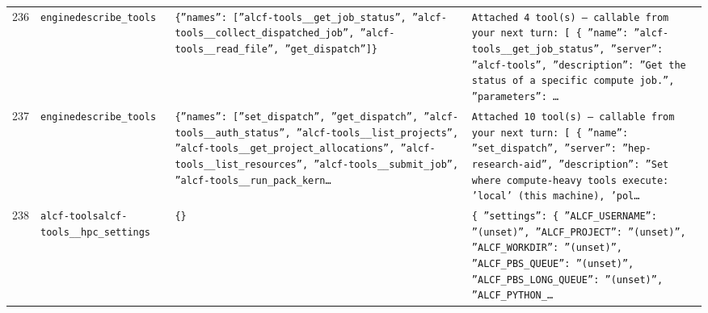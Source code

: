 \documentclass[11pt,a4paper]{article}
\begin{document}
\begin{longtable}{@{}p{}p{}p{}p{}@{}}
236 & \texttt{engine}\newline\texttt{describe\_\allowbreak{}tools} & \texttt{\{''names'':\allowbreak{} [''alcf-tools\_\allowbreak{}\_\allowbreak{}get\_\allowbreak{}job\_\allowbreak{}status'',\allowbreak{} ''alcf-tools\_\allowbreak{}\_\allowbreak{}collect\_\allowbreak{}dispatched\_\allowbreak{}job'',\allowbreak{} ''alcf-tools\_\allowbreak{}\_\allowbreak{}read\_\allowbreak{}file'',\allowbreak{} ''get\_\allowbreak{}dispatch'']\allowbreak{}\}\allowbreak{}} & \texttt{Attached 4 tool(s)\allowbreak{} --- callable from your next turn:\allowbreak{} [  \{   ''name'':\allowbreak{} ''alcf-tools\_\allowbreak{}\_\allowbreak{}get\_\allowbreak{}job\_\allowbreak{}status'',\allowbreak{}   ''server'':\allowbreak{} ''alcf-tools'',\allowbreak{}   ''description'':\allowbreak{} ''Get the status of a specific compute job.'',\allowbreak{}   ''parameters'':\allowbreak{} \ldots{}\allowbreak{}} \\
237 & \texttt{engine}\newline\texttt{describe\_\allowbreak{}tools} & \texttt{\{''names'':\allowbreak{} [''set\_\allowbreak{}dispatch'',\allowbreak{} ''get\_\allowbreak{}dispatch'',\allowbreak{} ''alcf-tools\_\allowbreak{}\_\allowbreak{}auth\_\allowbreak{}status'',\allowbreak{} ''alcf-tools\_\allowbreak{}\_\allowbreak{}list\_\allowbreak{}projects'',\allowbreak{} ''alcf-tools\_\allowbreak{}\_\allowbreak{}get\_\allowbreak{}project\_\allowbreak{}allocations'',\allowbreak{} ''alcf-tools\_\allowbreak{}\_\allowbreak{}list\_\allowbreak{}resources'',\allowbreak{} ''alcf-tools\_\allowbreak{}\_\allowbreak{}submit\_\allowbreak{}job'',\allowbreak{} ''alcf-tools\_\allowbreak{}\_\allowbreak{}run\_\allowbreak{}pack\_\allowbreak{}kern\ldots{}\allowbreak{}} & \texttt{Attached 10 tool(s)\allowbreak{} --- callable from your next turn:\allowbreak{} [  \{   ''name'':\allowbreak{} ''set\_\allowbreak{}dispatch'',\allowbreak{}   ''server'':\allowbreak{} ''hep-research-aid'',\allowbreak{}   ''description'':\allowbreak{} ''Set where compute-heavy tools execute:\allowbreak{} 'local' (this machine)\allowbreak{},\allowbreak{} 'pol\ldots{}\allowbreak{}} \\
238 & \texttt{alcf-tools}\newline\texttt{alcf-tools\_\allowbreak{}\_\allowbreak{}hpc\_\allowbreak{}settings} & \texttt{\{\}\allowbreak{}} & \texttt{\{   ''settings'':\allowbreak{} \{     ''ALCF\_\allowbreak{}USERNAME'':\allowbreak{} ''(unset)\allowbreak{}'',\allowbreak{}     ''ALCF\_\allowbreak{}PROJECT'':\allowbreak{} ''(unset)\allowbreak{}'',\allowbreak{}     ''ALCF\_\allowbreak{}WORKDIR'':\allowbreak{} ''(unset)\allowbreak{}'',\allowbreak{}     ''ALCF\_\allowbreak{}PBS\_\allowbreak{}QUEUE'':\allowbreak{} ''(unset)\allowbreak{}'',\allowbreak{}     ''ALCF\_\allowbreak{}PBS\_\allowbreak{}LONG\_\allowbreak{}QUEUE'':\allowbreak{} ''(unset)\allowbreak{}'',\allowbreak{}     ''ALCF\_\allowbreak{}PYTHON\_\allowbreak{}\ldots{}\allowbreak{}} \\

\end{longtable}
\end{document}

